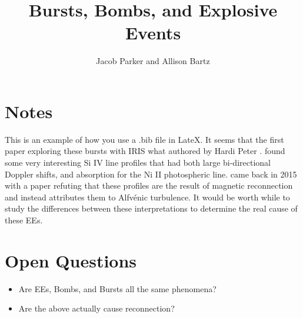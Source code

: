 \documentclass[]{aastex6}
\begin{document}
	\title{Bursts, Bombs, and Explosive Events}

\author{Jacob Parker and Allison Bartz}

\section{Notes}

	This is an example of how you use a .bib file in LateX.  It seems that the first paper exploring these bursts with IRIS what authored by Hardi Peter \citep{Peter2014}.  \citet{Peter2014} found some very interesting Si {\sc IV} line profiles that had both large bi-directional Doppler shifts, and absorption for the Ni {\sc II} photospheric line.  \citet{Judge2015} came back in 2015 with a paper refuting that these profiles are the result of magnetic reconnection and instead attributes them to Alfv\'enic turbulence.  It would be worth while to study the differences between these interpretations to determine the real cause of these EEs.
	
\section{Open Questions}
	\begin{itemize}
		\item Are EEs, Bombs, and Bursts all the same phenomena?
		\item Are the above actually cause reconnection?
	
	\end{itemize}
	


\end{document}
